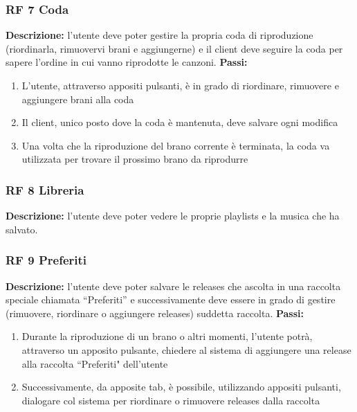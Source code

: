 \documentclass[a4paper,12pt]{article}
\begin{document}
\subsubsection*{RF 7 Coda}

\textbf{Descrizione:} l’utente deve poter gestire la propria coda di riproduzione (riordinarla, rimuovervi brani e aggiungerne) e il client deve seguire la coda per sapere l’ordine in cui vanno riprodotte le canzoni. \newline
\textbf{Passi:}
\begin{enumerate}
    \item L’utente, attraverso appositi pulsanti, è in grado di riordinare, rimuovere e aggiungere brani alla coda
    \item Il client, unico posto dove la coda è mantenuta, deve salvare ogni modifica
    \item Una volta che la riproduzione del brano corrente è terminata, la coda va utilizzata per trovare il prossimo brano da riprodurre
\end{enumerate}

\subsubsection*{RF 8 Libreria}

\textbf{Descrizione:} l’utente deve poter vedere le proprie playlists e la musica che ha salvato.

\subsubsection*{RF 9 Preferiti}

\textbf{Descrizione:} l’utente deve poter salvare le releases che ascolta in una raccolta speciale chiamata “Preferiti” e successivamente deve essere in grado di gestire (rimuovere, riordinare o aggiungere releases) suddetta raccolta. \newline
\textbf{Passi:}
\begin{enumerate}
    \item Durante la riproduzione di un brano o altri momenti, l’utente potrà, attraverso un apposito pulsante, chiedere al sistema di aggiungere una release alla raccolta “Preferiti" dell’utente
    \item Successivamente, da apposite tab, è possibile, utilizzando appositi pulsanti, dialogare col sistema per riordinare o rimuovere releases dalla raccolta
\end{enumerate}
\end{document}
